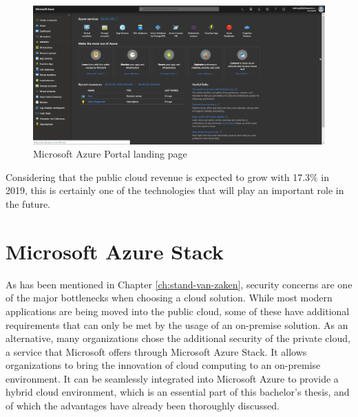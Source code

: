 \begin{figure}[h]
	\captionsetup{width=0.8\linewidth}
	\includegraphics[width=0.9\linewidth]{img/Toekomstvisie/Azure0.png}
	\centering
	\caption[Azure Portal]{Microsoft Azure Portal landing page}
	\label{fig:Azure_Portal}
\end{figure}
Considering that the public cloud revenue is expected to grow with 17.3\% in 2019, this is certainly one of the technologies that will play an important role in the future. \autocite{Ng2018}

\section{Microsoft Azure Stack}
As has been mentioned in Chapter \ref{ch:stand-van-zaken}, security concerns are one of the major bottlenecks when choosing a cloud solution. 
While most modern applications are being moved into the public cloud, some of these have additional requirements that can only be met by the usage of an on-premise solution. 
As an alternative, many organizations chose the additional security of the private cloud, a service that Microsoft offers through Microsoft Azure Stack. 
It allows organizations to bring the innovation of cloud computing to an on-premise environment.
It can be seamlessly integrated into Microsoft Azure to provide a hybrid cloud environment, which is an essential part of this bachelor's thesis, and of which the advantages have already been thoroughly discussed.


